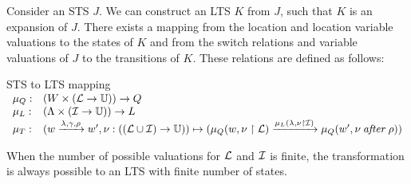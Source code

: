 Consider an STS $J$. We can construct an LTS $K$ from $J$, such that $K$ is an expansion of $J$. There exists a mapping from the location and location variable valuations to the states of $K$ and from the switch relations and variable valuations of $J$ to the transitions of $K$. These relations are defined as follows:
\vspace{10px}
\begin{definition} STS to LTS mapping \\
$\begin{array}{ll}
\mu_Q: & (W \times (\mathcal{L} \rightarrow \mathbb{U})) \rightarrow Q \\
\mu_L: & (\Lambda \times (\mathcal{I} \rightarrow \mathbb{U})) \rightarrow L \\
\mu_T: & (w\xrightarrow{\lambda,\gamma,\rho}w', \nu: ((\mathcal{L} \cup \mathcal{I}) \rightarrow \mathbb{U})) \mapsto (\mu_Q(w, \nu \restriction \mathcal{L}) \xrightarrow{\mu_L(\lambda, \nu \restriction\mathcal{I})} \mu_Q(w', \nu\:\mathit{after}\:\rho))
\end{array}$
\end{definition}
\vspace{10px}
\begin{comment}
These relations are constructed as follows: for a switch relation $r$ from location $A$ to location $B$, a valuation of the location variables $\nu_l$ and interaction variables $\nu_i$, $\mu_l:(A,\nu_l)$ maps to a state $q$, where $q$ is the source state of a transition $t$, if the result of the valuation $\nu:(\phi$ of $r, \nu_l \cup \nu_i)$ is true. $\nu_{l_new}$ is the new valuation of the location variables constructed by the valuation of $\rho$ of $r$. Then, the target state $q'$ of $t$ is the state mapped by $\mu_l:(B,\nu_{l_new}$). The label of $t$ is a textual representation of $\Gates$ of $r$ and $\nu_i$. Applying this rule for the topology to all locations, switch relations and concrete values for the variables, results in $L$. The start state $q0$ of $L$ is the state mapped by $\mu_l:(l_0,\initializationFunction)$. All states not reachable from $q0$ are removed from $L$.
\end{comment}

When the number of possible valuations for $\mathcal{L}$ and $\mathcal{I}$ is finite, the transformation is always possible to an LTS with finite number of states.


